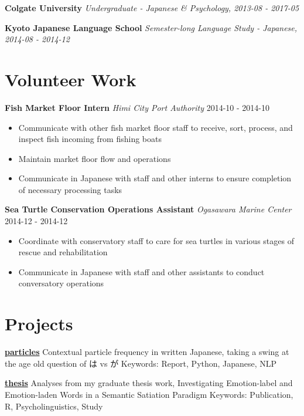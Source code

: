 \documentclass[a4paper,9pt]{extarticle}
\begin{document}
\noindent
\textbf{Colgate University}
\textit{Undergraduate - Japanese \& Psychology, 2013-08 - 2017-05}

\noindent
\textbf{Kyoto Japanese Language School}
\textit{Semester-long Language Study - Japanese, 2014-08 - 2014-12}



\section*{Volunteer Work}

\noindent
\textbf{Fish Market Floor Intern}
\noindent
\textit{Himi City Port Authority} \hfill 2014-10 - 2014-10
\begin{itemize}

\item Communicate with other fish market floor staff to receive, sort, process, and inspect fish incoming from fishing boats
\item Maintain market floor flow and operations
\item Communicate in Japanese with staff and other interns to ensure completion of necessary processing tasks
\end{itemize}

\noindent
\textbf{Sea Turtle Conservation Operations Assistant}
\noindent
\textit{Ogasawara Marine Center} \hfill 2014-12 - 2014-12
\begin{itemize}

\item Coordinate with conservatory staff to care for sea turtles in various stages of rescue and rehabilitation
\item Communicate in Japanese with staff and other assistants to conduct conversatory operations
\end{itemize}



\section*{Projects}

\noindent
\textbf{\href{https://github.com/ryancahildebrandt/particles}{particles}}
Contextual particle frequency in written Japanese, taking a swing at the age old question of は vs が
Keywords: Report, Python, Japanese, NLP

\noindent
\textbf{\href{https://github.com/ryancahildebrandt/thesis}{thesis}}
Analyses from my graduate thesis work, Investigating Emotion-label and Emotion-laden Words in a Semantic Satiation Paradigm
Keywords: Publication, R, Psycholinguistics, Study
\end{document}
